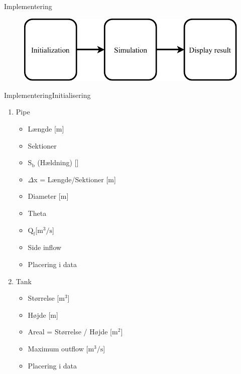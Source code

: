 \begin{frame}{Implementering}{}
 \vfill\vfill\centering  
\begin{figure}[H]
\centering
\includegraphics[width=0.75 \textwidth]{figures/Basic_implementation}
\label{fig:Basic_Implementering}
\end{figure}
 \vfill\vfill

\end{frame}
\begin{frame}{Implementering}{Initialisering}
    
\begin{table}[H]
\begin{enumerate} 
	\item Pipe
	\begin{itemize}
		\item Længde [m]
		\item Sektioner 
		\item $\text{S}_\text{b}$ (Hældning) [\textperthousand]
		\item $\Delta$x = Længde/Sektioner [m]
		\item Diameter [m]
		\item Theta 
		\item $\text{Q}_{\text{f}}$[$\text{m}^\text{3}/\text{s}$]
		\item Side inflow  
		\item Placering i data 
	\end{itemize}
	\item Tank
	\begin{itemize}
		\item Størrelse [$\text{m}^\text{3}$]
		\item Højde [m]
		\item Areal = Størrelse / Højde [$\text{m}^\text{2}$]
		\item Maximum outflow [$\text{m}^\text{3}/\text{s}$]
		\item Placering i data 
	\end{itemize}
	
\end{enumerate}
\label{tab:init_list}
\end{table}

\end{frame}


